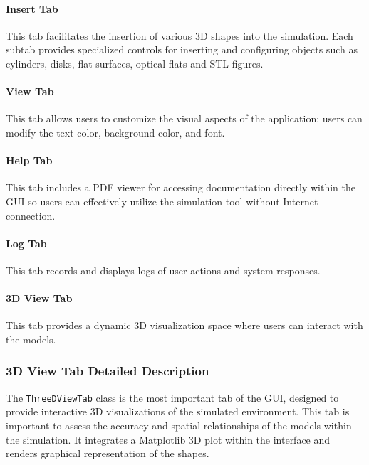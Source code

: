 \documentclass[../main.tex]{subfiles}
\begin{document}
\paragraph{Insert Tab}
This tab facilitates the insertion of various 3D shapes into the simulation. Each subtab provides specialized controls for inserting and configuring objects such as cylinders, disks, flat surfaces, optical flats and STL figures.
\vspace{-15pt}
\paragraph{View Tab}
This tab allows users to customize the visual aspects of the application: users can modify the text color, background color, and font.
\vspace{-15pt}
\paragraph{Help Tab}
This tab includes a PDF viewer for accessing documentation directly within the GUI so users can effectively utilize the simulation tool without Internet connection.
\vspace{-15pt}
\paragraph{Log Tab}
This tab records and displays logs of user actions and system responses.
\vspace{-15pt}
\paragraph{3D View Tab}
This tab provides a dynamic 3D visualization space where users can interact with the models.
\vspace{-15pt}
\subsubsection{3D View Tab Detailed Description}
\vspace{-8pt}
The \texttt{ThreeDViewTab} class is the most important tab of the GUI, designed to provide interactive 3D visualizations of the simulated environment. This tab is important to assess the accuracy and spatial relationships of the models within the simulation. It integrates a Matplotlib 3D plot within the interface and renders graphical representation of the shapes.
\vspace{-15pt}
\end{document}
